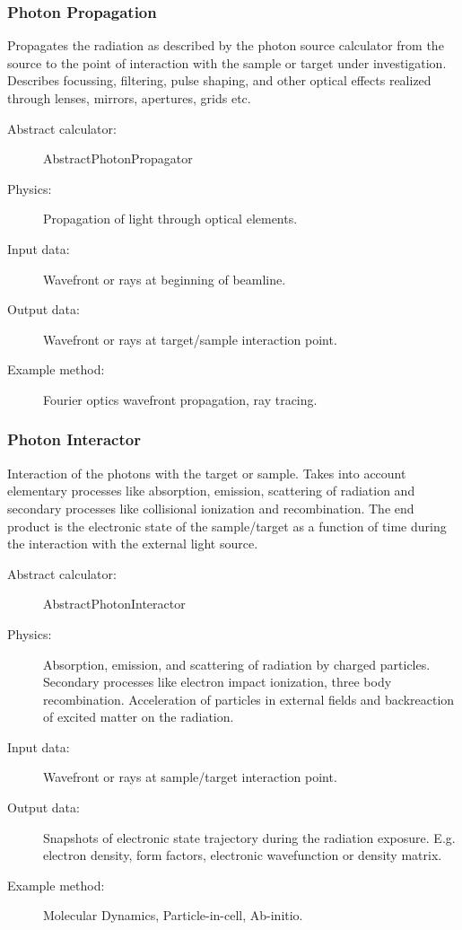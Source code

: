 \documentclass[a4paper]{article}
\begin{document}
\subsubsection{Photon Propagation}
Propagates the radiation as described by the photon source calculator from the source to the point of interaction with the sample or target under
    investigation. Describes focussing, filtering, pulse shaping,
    and other optical effects realized through lenses, mirrors, apertures, grids etc.
\begin{description}
  \item[Abstract calculator:] AbstractPhotonPropagator
  \item[Physics:] Propagation of light through optical elements.
  \item[Input data:] Wavefront or rays at beginning of beamline.
  \item[Output data:] Wavefront or rays at target/sample interaction point.
  \item[Example method:] Fourier optics wavefront propagation, ray tracing.
\end{description}
%
\subsubsection{Photon Interactor}
Interaction of the photons with the target or sample. Takes into account elementary processes like absorption, emission, scattering of radiation and secondary processes like collisional ionization and recombination. The end product is the electronic state of the sample/target as a function of time during the interaction with the external light source.
\begin{description}
  \item[Abstract calculator:] AbstractPhotonInteractor
  \item[Physics:] Absorption, emission, and scattering of radiation by charged particles. Secondary processes like electron impact ionization, three
    body recombination. Acceleration of particles in external fields and backreaction of excited matter on the radiation.
  \item[Input data:] Wavefront or rays at sample/target interaction point.
  \item[Output data:] Snapshots of electronic state trajectory during the radiation exposure. E.g. electron density, form factors, electronic
    wavefunction or density matrix.
  \item[Example method:] Molecular Dynamics, Particle-in-cell, Ab-initio.
\end{description}
%
\end{document}
